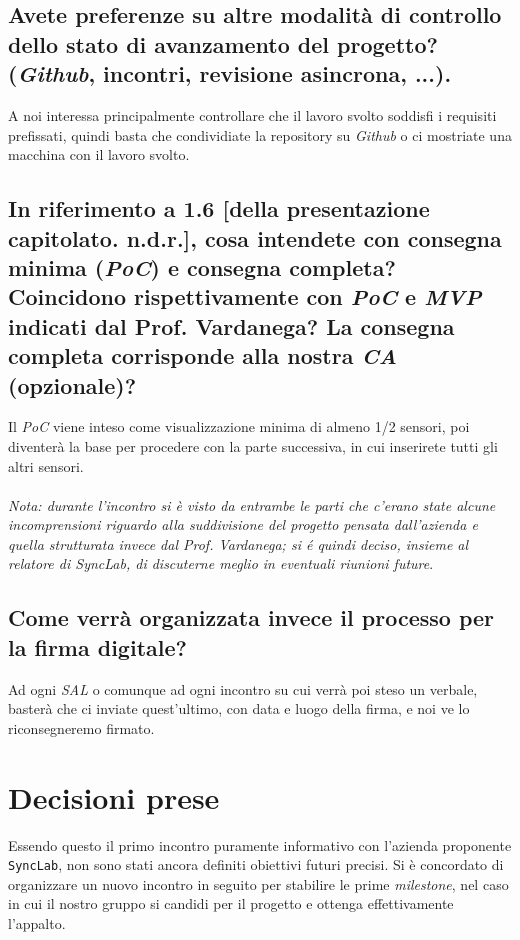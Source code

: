 \subsection{Avete preferenze su altre modalità di controllo dello stato di avanzamento del progetto? (\textit{Github}, incontri, revisione asincrona, ...).}
A noi interessa principalmente controllare che il lavoro svolto soddisfi i requisiti prefissati, quindi basta che condividiate la repository su \textit{Github} o ci mostriate una macchina con il lavoro svolto.
\subsection{In riferimento a 1.6 [della presentazione capitolato. n.d.r.], cosa intendete con consegna minima (\textit{PoC}) e consegna completa? Coincidono rispettivamente con \textit{PoC} e \textit{MVP} indicati dal Prof. Vardanega? La consegna completa corrisponde alla nostra \textit{CA} (opzionale)?}
Il \textit{PoC} viene inteso come visualizzazione minima di almeno 1/2 sensori, poi diventerà la base per procedere con la parte successiva, in cui  inserirete tutti gli altri sensori.\\\\
\emph{Nota: durante l'incontro si è visto da entrambe le parti che c'erano state alcune incomprensioni riguardo alla suddivisione del progetto pensata dall'azienda e quella strutturata invece dal Prof. Vardanega; si é quindi deciso, insieme al relatore di SyncLab, di discuterne meglio in eventuali riunioni future}.
\subsection{Come verrà organizzata invece il processo per la firma digitale?}
Ad ogni \textit{SAL} o comunque ad ogni incontro su cui verrà poi steso un verbale, basterà che ci inviate quest'ultimo, con data e luogo della firma, e noi ve lo riconsegneremo firmato.

\section{Decisioni prese}
Essendo questo il primo incontro puramente informativo con l'azienda proponente \texttt{SyncLab}, non sono stati ancora definiti obiettivi futuri precisi. Si è concordato di organizzare un nuovo incontro in seguito per stabilire le prime \textit{milestone}, nel caso in cui il nostro gruppo si candidi per il progetto e ottenga effettivamente l'appalto.\\\\



